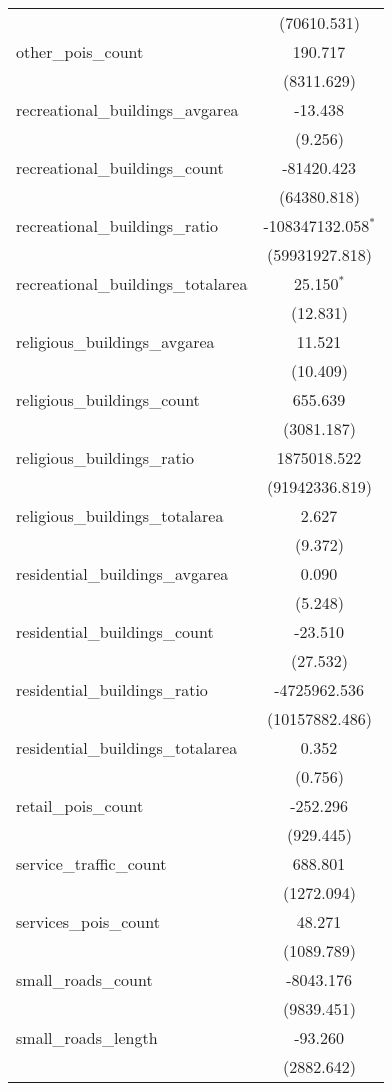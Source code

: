 \begin{table}[!htbp]
\begin{tabular}{@{\extracolsep{5pt}}lc}
  & (70610.531) \\
 other_pois_count & 190.717$^{}$ \\
  & (8311.629) \\
 recreational_buildings_avgarea & -13.438$^{}$ \\
  & (9.256) \\
 recreational_buildings_count & -81420.423$^{}$ \\
  & (64380.818) \\
 recreational_buildings_ratio & -108347132.058$^{*}$ \\
  & (59931927.818) \\
 recreational_buildings_totalarea & 25.150$^{*}$ \\
  & (12.831) \\
 religious_buildings_avgarea & 11.521$^{}$ \\
  & (10.409) \\
 religious_buildings_count & 655.639$^{}$ \\
  & (3081.187) \\
 religious_buildings_ratio & 1875018.522$^{}$ \\
  & (91942336.819) \\
 religious_buildings_totalarea & 2.627$^{}$ \\
  & (9.372) \\
 residential_buildings_avgarea & 0.090$^{}$ \\
  & (5.248) \\
 residential_buildings_count & -23.510$^{}$ \\
  & (27.532) \\
 residential_buildings_ratio & -4725962.536$^{}$ \\
  & (10157882.486) \\
 residential_buildings_totalarea & 0.352$^{}$ \\
  & (0.756) \\
 retail_pois_count & -252.296$^{}$ \\
  & (929.445) \\
 service_traffic_count & 688.801$^{}$ \\
  & (1272.094) \\
 services_pois_count & 48.271$^{}$ \\
  & (1089.789) \\
 small_roads_count & -8043.176$^{}$ \\
  & (9839.451) \\
 small_roads_length & -93.260$^{}$ \\
  & (2882.642) \\

\end{tabular}
\end{table}
